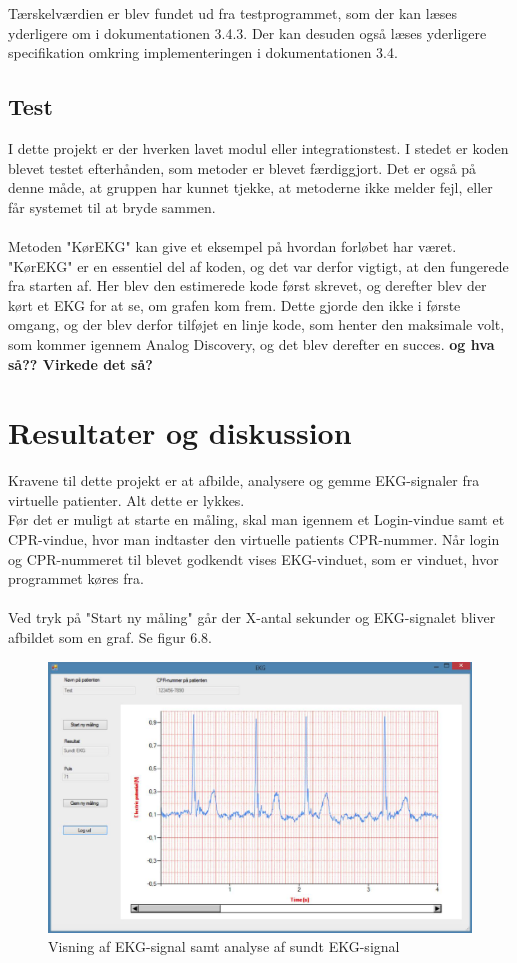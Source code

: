 Tærskelværdien er blev fundet ud fra testprogrammet, som der kan læses yderligere om i dokumentationen 3.4.3. Der kan desuden også læses yderligere specifikation omkring implementeringen i dokumentationen 3.4. 


\subsection{Test}
I dette projekt er der hverken lavet modul eller integrationstest. I stedet er koden blevet testet efterhånden, som metoder er blevet færdiggjort. Det er også på denne måde, at gruppen har kunnet tjekke, at metoderne ikke melder fejl, eller får systemet til at bryde sammen. \\ \\
Metoden "KørEKG" kan give et eksempel på hvordan forløbet har været. "KørEKG" er en essentiel del af koden, og det var derfor vigtigt, at den fungerede fra starten af. Her blev den estimerede kode først skrevet, og derefter blev der kørt et EKG for at se, om grafen kom frem. Dette gjorde den ikke i første omgang, og der blev derfor tilføjet en linje kode, som henter den maksimale volt, som kommer igennem Analog Discovery, og det blev derefter en succes. \textbf{og hva så?? Virkede det så?}

\section{Resultater og diskussion}
Kravene til dette projekt er at afbilde, analysere og gemme EKG-signaler fra virtuelle patienter. Alt dette er lykkes. \\ 
Før det er muligt at starte en måling, skal man igennem et Login-vindue samt et CPR-vindue, hvor man indtaster den virtuelle patients CPR-nummer. Når login og CPR-nummeret til blevet godkendt vises EKG-vinduet, som er vinduet, hvor programmet køres fra. \\ \\
Ved tryk på "Start ny måling" går der X-antal sekunder og EKG-signalet bliver afbildet som en graf. Se figur 6.8. 

\begin{figure}[H]
	\centering
	\includegraphics[width=1\textwidth]{Figurer/Snip20150525_25}
	\caption{Visning af EKG-signal samt analyse af sundt EKG-signal}
\end{figure}

